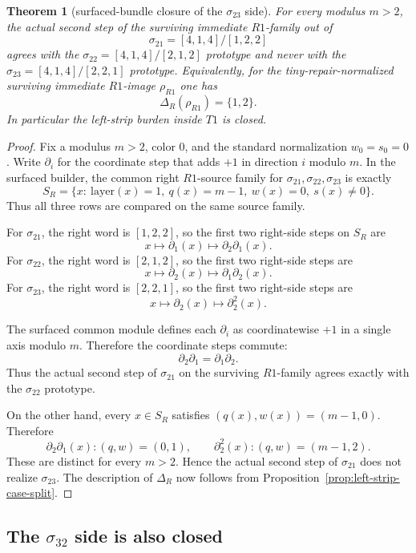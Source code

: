 \documentclass[11pt]{article}
\newtheorem{theorem}{Theorem}[section]
\newcommand{\sig}[2]{\sigma_{#1#2}}
\newcommand{\RhoR}{\rho_{R1}}
\begin{document}
\begin{theorem}[surfaced-bundle closure of the \(\sig23\) side]
\label{thm:sigma23-closed}
For every modulus \(m>2\), the actual second step of the surviving immediate
\(R1\)-family out of
\[
\sig21=[4,1,4]/[1,2,2]
\]
agrees with the \(\sig22=[4,1,4]/[2,1,2]\) prototype and never with the
\(\sig23=[4,1,4]/[2,2,1]\) prototype.
Equivalently, for the tiny-repair-normalized surviving immediate \(R1\)-image
\(\RhoR\) one has
\[
\Delta_R(\RhoR)=\{1,2\}.
\]
In particular the left-strip burden inside \(T1\) is closed.
\end{theorem}

\begin{proof}
Fix a modulus \(m>2\), color \(0\), and the standard normalization
\(w_0=s_0=0\).
Write \(\partial_i\) for the coordinate step that adds \(+1\) in direction
\(i\) modulo \(m\).
In the surfaced builder, the common right \(R1\)-source family for
\(\sig21,\sig22,\sig23\) is exactly
\[
S_R=\{x:\ \mathrm{layer}(x)=1,\ q(x)=m-1,\ w(x)=0,\ s(x)\neq 0\}.
\]
Thus all three rows are compared on the same source family.

For \(\sig21\), the right word is \([1,2,2]\), so the first two right-side
steps on \(S_R\) are
\[
x\mapsto \partial_1(x)\mapsto \partial_2\partial_1(x).
\]
For \(\sig22\), the right word is \([2,1,2]\), so the first two right-side
steps are
\[
x\mapsto \partial_2(x)\mapsto \partial_1\partial_2(x).
\]
For \(\sig23\), the right word is \([2,2,1]\), so the first two right-side
steps are
\[
x\mapsto \partial_2(x)\mapsto \partial_2^2(x).
\]

The surfaced common module defines each \(\partial_i\) as coordinatewise
\(+1\) in a single axis modulo \(m\).  Therefore the coordinate steps
commute:
\[
\partial_2\partial_1=\partial_1\partial_2.
\]
Thus the actual second step of \(\sig21\) on the surviving \(R1\)-family agrees
exactly with the \(\sig22\) prototype.

On the other hand, every \(x\in S_R\) satisfies \((q(x),w(x))=(m-1,0)\).
Therefore
\[
\partial_2\partial_1(x):(q,w)=(0,1),\qquad
\partial_2^2(x):(q,w)=(m-1,2).
\]
These are distinct for every \(m>2\).  Hence the actual second step of
\(\sig21\) does not realize \(\sig23\).
The description of \(\Delta_R\) now follows from
Proposition~\ref{prop:left-strip-case-split}.
\end{proof}

\subsection{The \texorpdfstring{$\sig32$}{sigma32} side is also closed}
\end{document}
